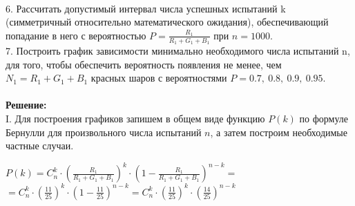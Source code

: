 \documentclass{article}
\begin{document}
\vspace{\baselineskip}
\\
\large 6. Рассчитать допустимый интервал числа успешных испытаний k (симметричный относительно математического ожидания), обеспечивающий попадание в него с вероятностью \begin{math}P = \displaystyle\frac{R_1}{R_1 + G_1 + B_1}\end{math} при \begin{math}n = 1000\end{math}.
\vspace{\baselineskip}
\\
\large 7. Построить график зависимости минимально необходимого числа испытаний n, для того, чтобы обеспечить вероятность появления не менее, чем \begin{math}N_1 = R_1 + G_1 + B_1\end{math} красных шаров с вероятностями \begin{math}P = 0.7,\ 0.8,\ 0.9,\ 0.95\end{math}.
\vspace{\baselineskip}
\\
\vspace{\baselineskip}
\\
\textbf{Решение:}
\vspace{\baselineskip}
\\
I. Для построения графиков запишем в общем виде функцию \begin{math}P(k)\end{math} по формуле Бернулли для произвольного числа испытаний \begin{math}n\end{math}, а затем построим необходимые частные случаи.
\begin{center}
\begin{math}P(k) = C^k_n \cdot \left(\displaystyle\frac{R_1}{R_1 + G_1 + B_1}\right)^k \cdot \left(1 - \displaystyle\frac{R_1}{R_1 + G_1 + B_1}\right)^{n-k} =  \end{math}
\vspace{\baselineskip}
\\
\begin{math} = C^k_n \cdot \left(\displaystyle\frac{11}{25}\right)^k \cdot \left(1 - \displaystyle\frac{11}{25}\right)^{n-k} = C^k_n \cdot \left(\displaystyle\frac{11}{25}\right)^k \cdot \left(\displaystyle\frac{14}{25}\right)^{n-k} \end{math}
\end{center}
\vspace{\baselineskip}
\end{document}
